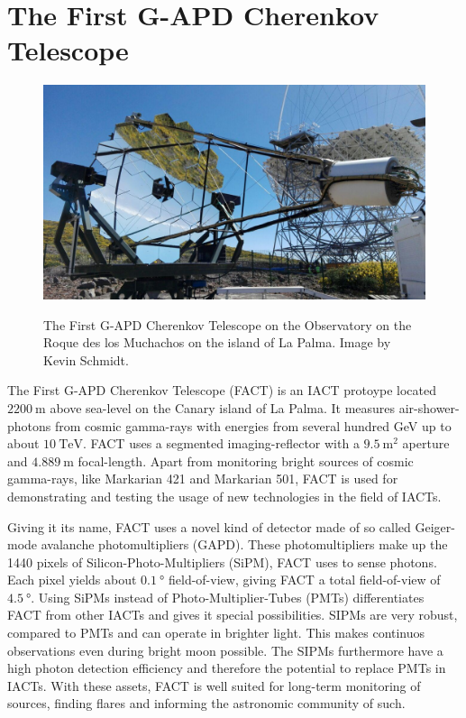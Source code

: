 \chapter{The First G-APD Cherenkov Telescope}
%
\begin{figure}
  \centering
  \includegraphics[width=\textwidth]{Plots/fact.jpg}
  \label{fig:fact}
  \caption{The First G-APD Cherenkov Telescope on the Observatory on the Roque des los Muchachos on the island of La Palma. Image by Kevin Schmidt.}
\end{figure}
%
The First G-APD Cherenkov Telescope \cite{FACT-Design} (FACT) is an IACT
protoype located $\SI{2200}{\metre}$ above sea-level on the Canary island of La
Palma. It measures air-shower-photons from cosmic gamma-rays with energies from
several hundred GeV up to about $\SI{10}{\tera\electronvolt}$. FACT uses a
segmented imaging-reflector with a $\SI{9.5}{\meter\squared}$ aperture and
$\SI{4.889}{\meter}$ focal-length. Apart from monitoring bright sources of
cosmic gamma-rays, like Markarian 421 and Markarian 501, FACT is used for
demonstrating and testing the usage of new technologies in the field of IACTs.

Giving it its name, FACT uses a novel kind of detector made of so called
Geiger-mode avalanche photomultipliers (GAPD). These photomultipliers make up
the 1440 pixels of Silicon-Photo-Multipliers (SiPM), FACT uses to sense
photons. Each pixel yields about $\SI{0.1}{\degree}$ field-of-view, giving FACT
a total field-of-view of $\SI{4.5}{\degree}$. Using SiPMs instead of
Photo-Multiplier-Tubes (PMTs) differentiates FACT from other IACTs and gives it
special possibilities. SIPMs are very robust, compared to PMTs and can operate
in brighter light. This makes continuos observations even during bright moon
possible. The SIPMs furthermore have a high photon detection efficiency and therefore the potential to replace PMTs in IACTs. With
these assets, FACT is well suited for long-term monitoring of sources, finding
flares and informing the astronomic community of such.

